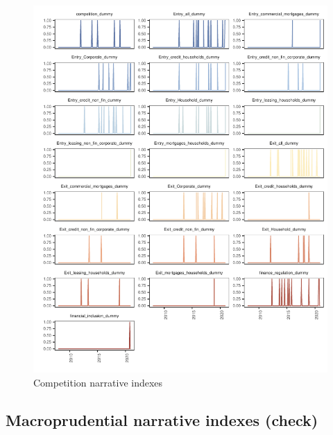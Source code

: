 \documentclass[
  letterpaper,
  DIV=11,
  numbers=noendperiod]{scrartcl}
\begin{document}
\begin{figure}[H]

{\centering \includegraphics{UP_paper_files/figure-pdf/fig-comp_narrative_indexes-1.pdf}

}

\caption{\label{fig-comp_narrative_indexes}Competition narrative
indexes}

\end{figure}

\hypertarget{macroprudential-narrative-indexes-check}{%
\subsection{Macroprudential narrative indexes
(check)}\label{macroprudential-narrative-indexes-check}}
\end{document}
